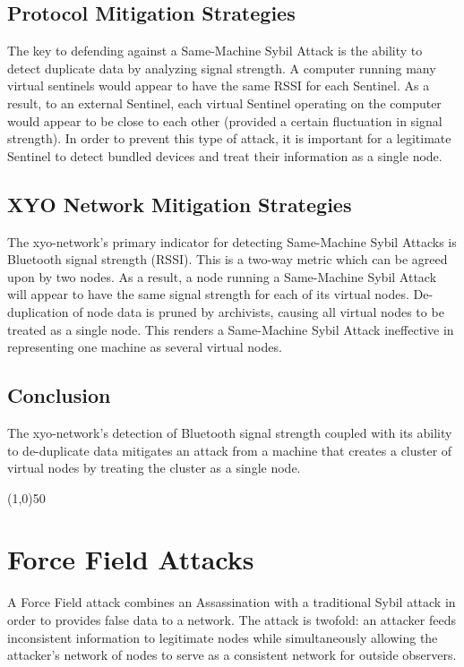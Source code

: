 \documentclass{article}
\begin{document}
\subsection{Protocol Mitigation Strategies}

The key to defending against a Same-Machine Sybil Attack is the ability to detect duplicate data by analyzing signal strength. A computer running many virtual \Glspl{sentinel} would appear to have the same RSSI for each Sentinel. As a result, to an external Sentinel, each virtual Sentinel operating on the computer would appear to be close to each other (provided a certain fluctuation in signal strength). In order to prevent this type of attack, it is important for a legitimate Sentinel to detect bundled devices and treat their information as a single node.

\subsection{XYO Network Mitigation Strategies}

The \Gls{xyo-network}'s primary indicator for detecting Same-Machine Sybil Attacks is Bluetooth signal strength (RSSI). This is a two-way metric which can be agreed upon by two nodes. As a result, a node running a Same-Machine Sybil Attack will appear to have the same signal strength for each of its virtual nodes. De-duplication of node data is pruned by \Glspl{archivist}, causing all virtual nodes to be treated as a single node. This renders a Same-Machine Sybil Attack ineffective in representing one machine as several virtual nodes.

\subsection{Conclusion}

The \Gls{xyo-network}'s detection of Bluetooth signal strength coupled with its ability to de-duplicate data mitigates an attack from a machine that creates a cluster of virtual nodes by treating the cluster as a single node.

\begin{center}
\line(1,0){50}
\end{center}

\section{Force Field Attacks}
A Force Field attack combines an Assassination with a traditional Sybil attack in order to provides false data to a network. The attack is twofold: an attacker feeds inconsistent information to legitimate nodes while simultaneously allowing the attacker's network of nodes to serve as a consistent network for outside observers.
\end{document}
